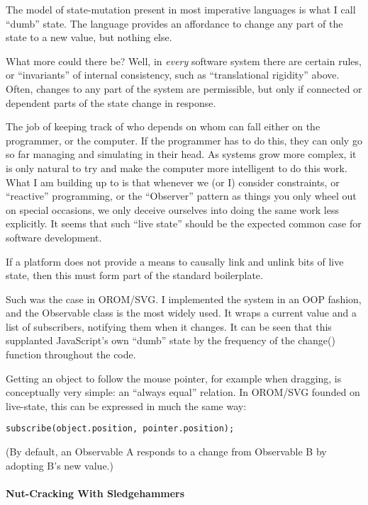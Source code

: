 \documentclass[english,submission]{programming}
\begin{document}
The model of state-mutation present in most imperative languages is what
I call ``dumb'' state. The language provides an affordance to change any
part of the state to a new value, but nothing else.

What more could there be? Well, in \emph{every} software system there
are certain rules, or ``invariants'' of internal consistency, such as
``translational rigidity'' above. Often, changes to any part of the
system are permissible, but only if connected or dependent parts of the
state change in response.

The job of keeping track of who depends on whom can fall either on the
programmer, or the computer. If the programmer has to do this, they can
only go so far managing and simulating in their head. As systems grow
more complex, it is only natural to try and make the computer more
intelligent to do this work. What I am building up to is that whenever
we (or I) consider constraints, or ``reactive'' programming, or the
``Observer'' pattern as things you only wheel out on special occasions,
we only deceive ourselves into doing the same work less explicitly. It
seems that such ``live state'' should be the expected common case for
software development.

If a platform does not provide a means to causally link and unlink bits
of live state, then this must form part of the standard boilerplate.

Such was the case in OROM/SVG. I implemented the system in an OOP
fashion, and the Observable class is the most widely used. It wraps a
current value and a list of subscribers, notifying them when it changes.
It can be seen that this supplanted JavaScript's own ``dumb'' state by
the frequency of the change() function throughout the code.

Getting an object to follow the mouse pointer, for example when
dragging, is conceptually very simple: an ``always equal'' relation. In
OROM/SVG founded on live-state, this can be expressed in much the same
way:

\begin{verbatim}
subscribe(object.position, pointer.position);
\end{verbatim}

(By default, an Observable A responds to a change from Observable B by
adopting B's new value.)

\hypertarget{nut-cracking-with-sledgehammers}{%
\paragraph{Nut-Cracking With
Sledgehammers}\label{nut-cracking-with-sledgehammers}}
\end{document}
